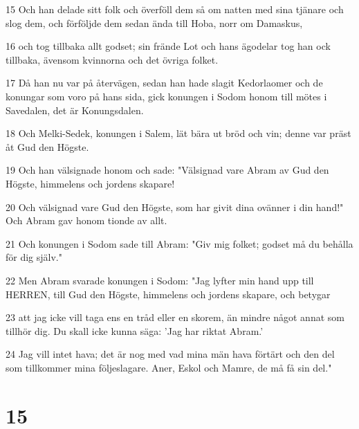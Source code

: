 \par 15 Och han delade sitt folk och överföll dem så om natten med sina tjänare och slog dem, och förföljde dem sedan ända till Hoba, norr om Damaskus,
\par 16 och tog tillbaka allt godset; sin frände Lot och hans ägodelar tog han ock tillbaka, ävensom kvinnorna och det övriga folket.
\par 17 Då han nu var på återvägen, sedan han hade slagit Kedorlaomer och de konungar som voro på hans sida, gick konungen i Sodom honom till mötes i Savedalen, det är Konungsdalen.
\par 18 Och Melki-Sedek, konungen i Salem, lät bära ut bröd och vin; denne var präst åt Gud den Högste.
\par 19 Och han välsignade honom och sade: "Välsignad vare Abram av Gud den Högste, himmelens och jordens skapare!
\par 20 Och välsignad vare Gud den Högste, som har givit dina ovänner i din hand!" Och Abram gav honom tionde av allt.
\par 21 Och konungen i Sodom sade till Abram: "Giv mig folket; godset må du behålla för dig själv."
\par 22 Men Abram svarade konungen i Sodom: "Jag lyfter min hand upp till HERREN, till Gud den Högste, himmelens och jordens skapare, och betygar
\par 23 att jag icke vill taga ens en tråd eller en skorem, än mindre något annat som tillhör dig. Du skall icke kunna säga: 'Jag har riktat Abram.'
\par 24 Jag vill intet hava; det är nog med vad mina män hava förtärt och den del som tillkommer mina följeslagare. Aner, Eskol och Mamre, de må få sin del."

\chapter{15}

